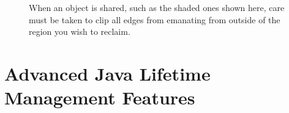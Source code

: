 \begin{figure}
\centering
{}
\qquad
{}
	\caption{When an object is shared, such as the shaded ones shown
	here, care must be taken to clip all edges from emanating from outside of the
	region you wish to reclaim.}
	\label{fig:reachability-sharing}
\end{figure}

\section{Advanced Java Lifetime Management Features}
 
